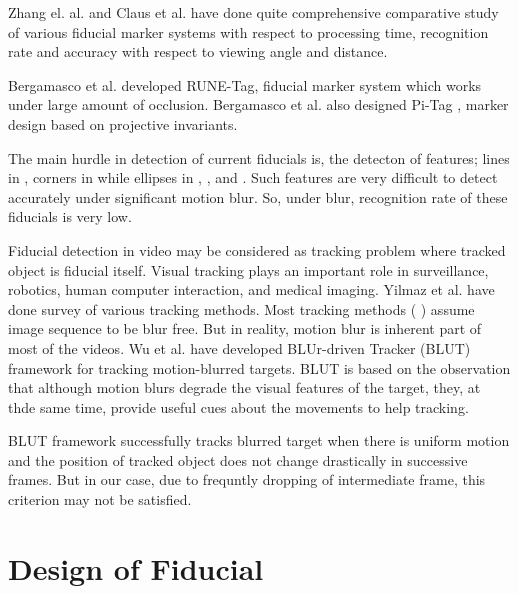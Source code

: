 \documentclass[runningheads]{llncs}
\begin{document}
Zhang el. al.\cite{Zhang:2002} and Claus et al. \cite{ClausF04} have done
quite comprehensive comparative study of various fiducial marker systems with
respect to processing time, recognition rate and accuracy with
respect to viewing angle and distance.

Bergamasco et al. \cite{runetag11} developed RUNE-Tag, fiducial marker
system which works under large amount of occlusion. Bergamasco et al. also 
designed Pi-Tag \cite{Pitag13}, marker design based on projective
invariants.

The main hurdle in detection of current fiducials is, the detecton of features;
lines in \cite{ARToolkit02}, corners in \cite{Fiala05} while ellipses in
\cite{Cho:2001}, \cite{Cho97fastcolor}, \cite{runetag11} and \cite{Pitag13}.
Such features are very difficult to detect accurately under significant motion
blur. So, under blur, recognition rate of these fiducials is very low. 

Fiducial detection in video may be considered as tracking problem where tracked
object is fiducial itself. Visual tracking plays an important role in
surveillance, robotics, human computer interaction, and medical
imaging\cite{Yilmaz:2006}. Yilmaz et al.\cite{Yilmaz:2006} have done survey of
various tracking methods. Most tracking methods
( \cite{Ross:2008} \cite{Wu:2009} \cite{Perez02} \cite{Mei:2009} ) assume image
sequence to be blur free. But in reality, motion blur is inherent part of most
of the videos. Wu et al.\cite{Wu:2011} have developed BLUr-driven Tracker (BLUT)
framework for tracking motion-blurred targets. BLUT is based on the observation
that although motion blurs degrade the visual features of the target, they, at
thde same time, provide useful cues about the movements to help tracking.
 
BLUT framework successfully tracks blurred target when there is uniform motion
and the position of tracked object does not change drastically in successive
frames. But in our case, due to frequntly dropping of intermediate frame, this
criterion may not be satisfied.
 
\section{Design of Fiducial}
\end{document}

